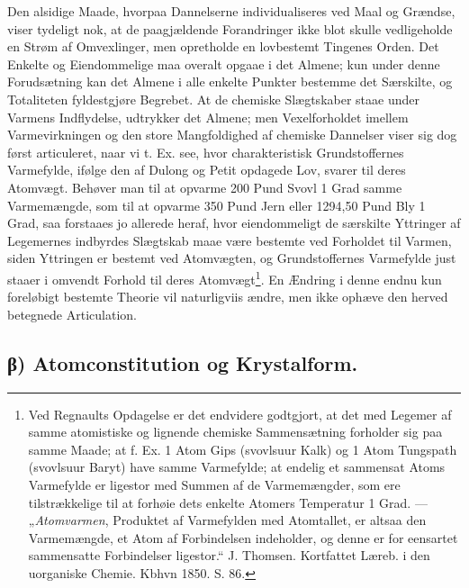 \documentclass[12pt,a4paper]{book}
\begin{document}
Den alsidige Maade, hvorpaa Dannelserne individualiseres
ved Maal og Grændse, viser tydeligt nok, at de paagjældende
Forandringer ikke blot skulle vedligeholde en Strøm af
Omvexlinger, men opretholde en lovbestemt Tingenes Orden.
Det Enkelte og Eiendommelige maa overalt opgaae i det
Almene; kun under denne Forudsætning kan det Almene i
alle enkelte Punkter bestemme det Særskilte, og Totaliteten
fyldestgjøre Begrebet. At de chemiske Slægtskaber staae under
Varmens Indflydelse, udtrykker det Almene; men Vexelforholdet
imellem Varmevirkningen og den store Mangfoldighed
af chemiske Dannelser viser sig dog først articuleret, naar
vi t. Ex. see, hvor charakteristisk Grundstoffernes Varmefylde,
ifølge den af Dulong og Petit opdagede Lov, svarer til deres
Atomvægt. Behøver man til at opvarme 200 Pund Svovl
1 Grad samme Varmemængde, som til at opvarme 350 Pund
Jern eller 1294,50 Pund Bly 1 Grad, saa forstaaes jo allerede
heraf, hvor eiendommeligt de særskilte Yttringer af Legemernes
indbyrdes Slægtskab maae være bestemte ved Forholdet til
Varmen, siden Yttringen er bestemt ved Atomvægten, og Grundstoffernes
Varmefylde just staaer i omvendt Forhold til deres
Atomvægt\footnote{Ved Regnaults Opdagelse er det endvidere godtgjort, at det med
Legemer af samme atomistiske og lignende chemiske Sammensætning
forholder sig paa samme Maade; at f. Ex. 1 Atom Gips
(svovlsuur Kalk) og 1 Atom Tungspath (svovlsuur Baryt) have
samme Varmefylde; at endelig et sammensat Atoms Varmefylde
er ligestor med Summen af de Varmemængder, som ere tilstrækkelige
til at forhøie dets enkelte Atomers Temperatur 1 Grad.
--- „\emph{Atomvarmen}, Produktet af Varmefylden med Atomtallet,
er altsaa den Varmemængde, et Atom af Forbindelsen indeholder,
og denne er for eensartet sammensatte Forbindelser ligestor.“
J. Thomsen. Kortfattet Læreb. i den uorganiske Chemie. Kbhvn
1850. S. 86.}. En Ændring i denne endnu kun foreløbigt
bestemte Theorie vil naturligviis ændre, men ikke ophæve den
herved betegnede Articulation.

\subsection*{β) Atomconstitution og Krystalform.}
\end{document}
